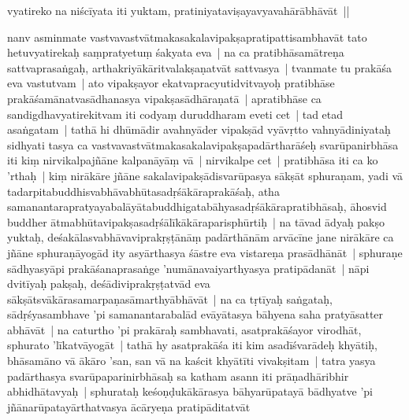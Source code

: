 \documentclass[article,12pt,a4paper]{memoir}%
\newcounter{parCount}
\begin{document}
vyatire\label{capv-np-4a-start}ko na niścīyata iti yuktam, pratiniyataviṣayavyavahārābhāvāt ||
	{}
	\pend%
      

	  
	  \pstart \leavevmode%
	\label{thakur75-131.13}nanv asminmate vastvavastvātmakasakalavipakṣapratipattisambhavāt tato hetuvyatirekaḥ saṃpratyetuṃ śakyata eva | na ca pratibhāsamātreṇa sattvaprasaṅgaḥ, arthakriyākāritvalakṣaṇatvāt sattvasya | tvanmate tu prakāśa eva vastutvam | ato vipakṣayor ekatvapracyu\label{ratnakīrtinibandhāvali__36r1PF7IMSLXLPJA0LN21NP81M7}tidvi\label{ratnakīrtinibandhāvali__36r1PF7IMSJYGHJZ8T01KRVE74E}tvayoḥ pratibhāse prakāśamānatvasādhanasya vipakṣasādhāraṇatā | apratibhāse ca sandigdhavyatirekitvam iti codyaṃ duruddharam eveti cet | tad etad asaṅgatam | tathā hi dhūmādir avahnyāder vipakṣād vyāvṛtto vahnyādiniyataḥ sidhyati tasya ca vastvavastvātmakasakalavipakṣapadārtharāśeḥ svarūpanirbhāsa iti kiṃ nirvikalpajñāne kalpanāyāṃ vā | nirvikalpe cet | pratibhāsa iti ca ko 'rthaḥ | kiṃ nirākāre jñāne sakalavipakṣādisvarūpasya sākṣāt sphuraṇam, yadi vā tadarpitabuddhisvabhāvabhūtasadṛśākāraprakāśaḥ, atha samanantarapratyayabalāyātabuddhigatabāhyasadṛśākārapratibhāsaḥ, āhosvid buddher ātmabhūtavipakṣasadṛśālīkākāraparisphūrtiḥ | \label{thakur75-131.24} na tāvad ādyaḥ pakṣo yuktaḥ, deśakā\label{capv-np-4a-end}\label{capv-np-4b-start}lasvabhāvaviprakṛṣṭānāṃ padārthānām arvācīne jane nirākāre ca jñāne sphuraṇāyogād ity asyārthasya śāstre eva vistareṇa prasādhānāt | sphuraṇe sādhyasyāpi prakāśanaprasaṅge 'numānavaiyarthyasya pratipādanāt | \label{thakur75-131.27} nāpi dvitīyaḥ pakṣaḥ, deśādiviprakṛṣṭatvād eva sākṣātsvākārasamarpaṇasāmarthyābhāvāt | \label{thakur75-131.29} na ca tṛtīyaḥ saṅgataḥ, sādṛśyasambhave 'pi samanantarabalād evāyātasya bāhyena saha pratyāsatter abhāvāt | \label{thakur75-131.31} na caturtho 'pi prakāraḥ sambhavati, asatprakāśayor virodhāt, sphurato 'līkatvāyogāt | tathā hy asatprakāśa iti kim asadīśvarādeḥ khyātiḥ, bhāsamāno vā ākāro 'san, san vā na kaścit khyātīti vivakṣitam | tatra yasya padārthasya svarūpaparinirbhāsaḥ sa katham asann iti prāṇadhāribhir abhidhātavyaḥ | sphurataḥ keśoṇḍukākārasya bāhyarūpatayā bādhyatve 'pi jñānarūpatayārthatvasya ācāryeṇa pratipāditatvāt 
\end{document}
